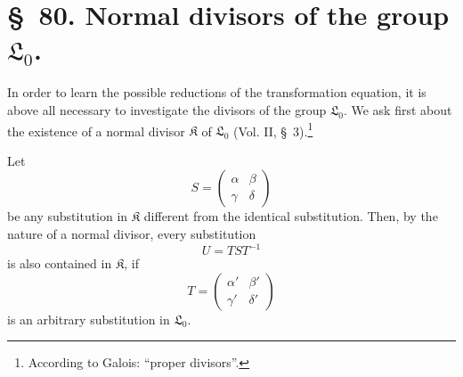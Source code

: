 \documentclass[11pt]{article}
\providecommand{\Lzero}{\mathfrak L_0}
\providecommand{\Kgrp}{\mathfrak K}
\begin{document}
\section*{\S~80. Normal divisors of the group $\Lzero$.}

In order to learn the possible reductions of the transformation equation, it is above all necessary to investigate the divisors of the group $\Lzero$. We ask first about the existence of a normal divisor $\Kgrp$ of $\Lzero$ (Vol. II, \S~3).\footnote{According to Galois: ``proper divisors''.}

Let
\begin{equation}
 S=\begin{pmatrix}\alpha&\beta\\\gamma&\delta\end{pmatrix}
\tag{1}
\end{equation}
be any substitution in $\Kgrp$ different from the identical substitution. Then, by the nature of a normal divisor, every substitution
\begin{equation}
 U=TST^{-1}
\tag{2}
\end{equation}
is also contained in $\Kgrp$, if
\begin{equation}
 T=\begin{pmatrix}\alpha'&\beta'\\\gamma'&\delta'\end{pmatrix}
\tag{3}
\end{equation}
is an arbitrary substitution in $\Lzero$.
\end{document}
